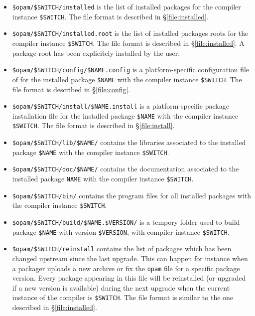 \documentclass[a4paper,10pt]{article}
\begin{document}
\begin{itemize}

\item \verb+$opam/$SWITCH/installed+ is the list of installed
  packages for the compiler instance \verb+$SWITCH+. The file format
  is described in \S\ref{file:installed}.

\item \verb+$opam/$SWITCH/installed.root+ is the list of installed
  packages roots for the compiler instance \verb+$SWITCH+.
  The file format is described in \S\ref{file:installed}. A package
  root has been explicitely installed by the user.

\item \verb+$opam/$SWITCH/config/$NAME.config+ is a
  platform-specific configuration file of for the installed package
  \verb+$NAME+ with the compiler instance \verb+$SWITCH+. The file
  format is described in \S\ref{file:config}.

\item \verb+$opam/$SWITCH/install/$NAME.install+ is a
  platform-specific package installation file for the installed
  package \verb+$NAME+ with the compiler instance \verb+$SWITCH+. The
  file format is described in \S\ref{file:install}.

\item \verb+$opam/$SWITCH/lib/$NAME/+ contains the libraries
  associated to the installed package \verb+$NAME+ with the compiler
  instance \verb+$SWITCH+.

\item \verb+$opam/$SWITCH/doc/$NAME/+ contains the documentation
  associated to the installed package {\tt NAME} with the compiler
  instance \verb+$SWITCH+.

\item \verb+$opam/$SWITCH/bin/+ contains the program files for all
  installed packages with the compiler instance
  \verb+$SWITCH+.

\item \verb+$opam/$SWITCH/build/$NAME.$VERSION/+ is a tempory folder
  used to build package \verb+$NAME+ with version \verb+$VERSION+,
  with compiler instance \verb+$SWITCH+.

\item \verb+$opam/$SWITCH/reinstall+ contains the list of packages
  which has been changed upstream since the last upgrade. This can
  happen for instance when a packager uploads a new archive or fix the
  {\tt opam} file for a specific package version. Every package appearing in
  this file will be reinstalled (or upgraded if a new version is
  available) during the next upgrade when the current instance of the
  compiler is \verb+$SWITCH+. The file format is similar to the one
  described in \S\ref{file:installed}.


\end{itemize}
\end{document}
